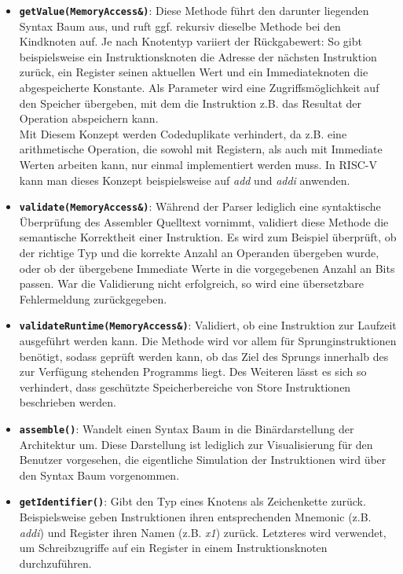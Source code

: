 \begin{itemize}
	\item \textbf{\texttt{getValue(MemoryAccess\&)}}: Diese Methode führt den
	darunter liegenden Syntax Baum aus, und ruft ggf. rekursiv dieselbe Methode
	bei den Kindknoten auf. Je nach Knotentyp variiert der Rückgabewert: So gibt
	beispielsweise ein Instruktionsknoten die Adresse der nächsten Instruktion
	zurück, ein Register seinen aktuellen Wert und ein Immediateknoten die
	abgespeicherte Konstante. Als Parameter wird eine Zugriffsmöglichkeit auf den
	Speicher übergeben, mit dem die Instruktion z.B. das Resultat der Operation
	abspeichern kann. \\
	Mit Diesem Konzept werden Codeduplikate verhindert, da z.B. eine arithmetische
	Operation, die sowohl mit Registern, als auch mit Immediate Werten arbeiten
	kann, nur einmal implementiert werden muss. In RISC-V kann man dieses Konzept
	beispielsweise auf \textit{add} und \textit{addi} anwenden.

	\item \textbf{\texttt{validate(MemoryAccess\&)}}: Während der Parser lediglich
	eine syntaktische Überprüfung des Assembler Quelltext vornimmt, validiert
	diese Methode die semantische Korrektheit einer Instruktion. Es wird zum
	Beispiel überprüft, ob der richtige Typ und die korrekte Anzahl an Operanden
	übergeben wurde, oder ob der übergebene Immediate Werte in die vorgegebenen
	Anzahl an Bits passen. War die Validierung nicht erfolgreich, so wird eine
	übersetzbare Fehlermeldung zurückgegeben.

	\item \textbf{\texttt{validateRuntime(MemoryAccess\&)}}: Validiert, ob eine
	Instruktion zur Laufzeit ausgeführt werden kann. Die Methode wird vor allem
	für Sprunginstruktionen benötigt, sodass geprüft werden kann, ob das Ziel
	des Sprungs innerhalb des zur Verfügung stehenden Programms liegt. Des
	Weiteren lässt es sich so verhindert, dass geschützte Speicherbereiche
	von Store Instruktionen beschrieben werden.

	\item \textbf{\texttt{assemble()}}: Wandelt einen Syntax Baum in die
	Binärdarstellung der Architektur um. Diese Darstellung ist lediglich zur
	Visualisierung für den Benutzer vorgesehen, die eigentliche Simulation der
	Instruktionen wird über den Syntax Baum vorgenommen.

	\item \textbf{\texttt{getIdentifier()}}: Gibt den Typ eines Knotens als
	Zeichenkette zurück. Beispielsweise geben Instruktionen ihren entsprechenden
	Mnemonic (z.B. \textit{addi}) und Register ihren Namen (z.B. \textit{x1})
	zurück. Letzteres wird verwendet, um Schreibzugriffe auf ein Register
	in einem Instruktionsknoten durchzuführen.
\end{itemize}

